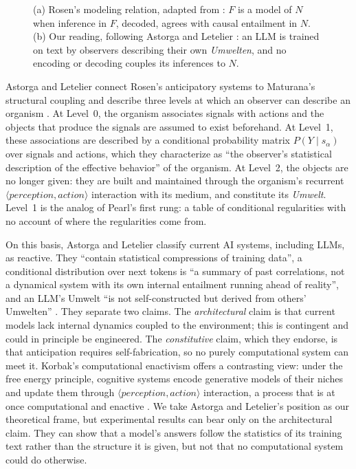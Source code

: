 \documentclass{llncs}
\begin{document}
\begin{figure}[t]
  \centering
  
  \caption{(a) Rosen's modeling relation, adapted from \cite[Fig.~2.1]{rosen2012anticipatory}:
  $F$ is a model of $N$ when inference in $F$, decoded, agrees with causal
  entailment in $N$. (b) Our reading, following Astorga and Letelier
  \cite{astorga2026anticipation}: an LLM is trained on text by observers
  describing their own \emph{Umwelten}, and no encoding or decoding couples
  its inferences to $N$.}
  \label{fig:rosen}
\end{figure}

Astorga and Letelier connect Rosen's anticipatory systems to Maturana's structural coupling and describe three levels at which an observer can describe an organism \cite{astorga2026anticipation}. At Level~0, the organism associates signals with actions and the objects that produce the signals are assumed to exist beforehand. At Level~1, these associations are described by a conditional probability matrix $P(Y \mid s_\alpha)$ over signals and actions, which they characterize as ``the observer's statistical description of the effective behavior'' of the organism. At Level~2, the objects are no longer given: they are built and maintained through the organism's recurrent $\langle perception, action \rangle$ interaction with its medium, and constitute its \emph{Umwelt}. Level~1 is the analog of Pearl's first rung: a table of conditional regularities with no account of where the regularities come from.

On this basis, Astorga and Letelier classify current AI systems, including LLMs, as reactive. They ``contain statistical compressions of training data'', a conditional distribution over next tokens is ``a summary of past correlations, not a dynamical system with its own internal entailment running ahead of reality'', and an LLM's Umwelt ``is not self-constructed but derived from others' Umwelten'' \cite{astorga2026anticipation}. They separate two claims. The \emph{architectural} claim is that current models lack internal dynamics coupled to the environment; this is contingent and could in principle be engineered. The \emph{constitutive} claim, which they endorse, is that anticipation requires self-fabrication, so no purely computational system can meet it. Korbak's computational enactivism offers a contrasting view: under the free energy principle, cognitive systems encode generative models of their niches and update them through $\langle perception, action \rangle$ interaction, a process that is at once computational and enactive \cite{korbak2021computational}. We take Astorga and Letelier's position as our theoretical frame, but experimental results can bear only on the architectural claim. They can show that a model's answers follow the statistics of its training text rather than the structure it is given, but not that no computational system could do otherwise.
\end{document}
